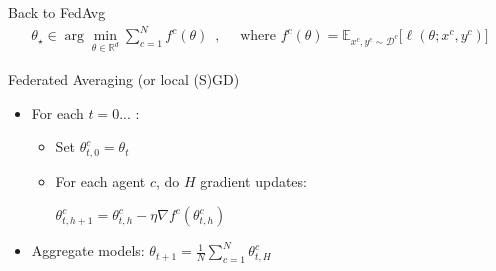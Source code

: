 \documentclass[aspectratio=169,14pt]{beamer}
\begin{document}
  
  \begin{frame}[t]{Back to FedAvg}
    \vspace{-3em}
    \begin{align*}
      \theta_\star \in \arg\min_{\theta \in \mathbb{R}^d} 
      \sum_{c=1}^N f^c(\theta)
      \enspace,
      \quad
      \text{ where }
      f^c(\theta) = \mathbb{E}_{x^c, y^c \sim \mathcal{D}^c} \Big[ \ell( \theta; x^c, y^c ) \Big]
    \end{align*}
    
    \vspace{-1em}

    Federated Averaging (or local (S)GD)

    \vspace{-0.5em}
    
    \begin{itemize}
    \item For each $t = 0 ...$ :
      \begin{itemize}
        \normalsize
      \item Set $\theta_{t,0}^c = \theta_t$
      \item For each agent $c$, do $H$ gradient updates: \\[0.5em]
        
        \begin{center}
          $\theta_{t,h+1}^c = \theta_{t,h}^c - \eta \nabla f^c( \theta_{t,h}^c )$
        \end{center}
        
        \vspace{0.5em}
        
      \end{itemize}
    \item Aggregate models: $\theta_{t+1} = \frac{1}{N} \sum_{c=1}^N \theta_{t,H}^c$
    \end{itemize}

    \vspace{0.5em}


    
  \end{frame}
\end{document}
